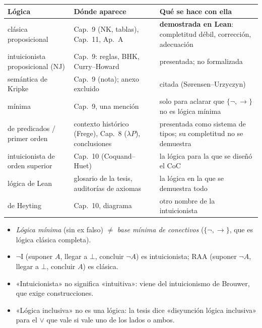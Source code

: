 \documentclass[11pt,a4paper]{article}
\begin{document}
\begin{center}
\renewcommand{\arraystretch}{1.25}
{\small
\begin{tabular}{@{}>{\raggedright\arraybackslash}p{3.6cm} >{\raggedright\arraybackslash}p{5.6cm} >{\raggedright\arraybackslash}p{5.6cm}@{}}
\toprule
\textbf{Lógica} & \textbf{Dónde aparece} & \textbf{Qué se hace con ella}\\
\midrule
clásica proposicional & Cap.\ 9 (NK, tablas), Cap.\ 11, Ap.\ A & \textbf{demostrada en Lean}: completitud débil, corrección, adecuación\\
intuicionista proposicional (NJ) & Cap.\ 9: reglas, BHK, Curry--Howard & presentada; no formalizada\\
semántica de Kripke & Cap.\ 9 (nota); anexo excluido & citada (Sørensen--Urzyczyn)\\
mínima & Cap.\ 9, una mención & solo para aclarar que \(\{\neg,\to\}\) no es lógica mínima\\
de predicados / primer orden & contexto histórico (Frege), Cap.\ 8 (\(\lambda P\)), conclusiones & presentada como sistema de tipos; su completitud no se demuestra\\
intuicionista de orden superior & Cap.\ 10 (Coquand--Huet) & la lógica para la que se diseñó el CoC\\
lógica de Lean & glosario de la tesis, auditorías de axiomas & la lógica en la que se demuestra todo\\
de Heyting & Cap.\ 10, diagrama & otro nombre de la intuicionista\\
\bottomrule
\end{tabular}}
\end{center}

\begin{nota}[No confundir]
\begin{itemize}
\item \emph{Lógica mínima} (sin ex falso) \(\neq\) \emph{base mínima de
  conectivos} (\(\{\neg,\to\}\), que es lógica clásica completa).
\item \(\neg\)I (suponer \(A\), llegar a \(\bot\), concluir \(\neg A\)) es
  intuicionista; RAA (suponer \(\neg A\), llegar a \(\bot\), concluir \(A\)) es
  clásica.
\item «Intuicionista» no significa «intuitiva»: viene del intuicionismo de
  Brouwer, que exige construcciones.
\item «Lógica inclusiva» no es una lógica: la tesis dice «disyunción lógica
  inclusiva» para el \(\vee\) que vale si vale uno de los lados o ambos.
\end{itemize}
\end{nota}
\end{document}
